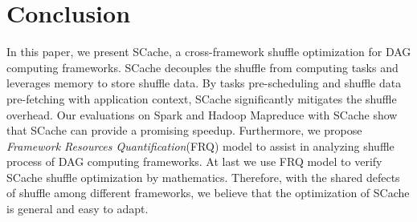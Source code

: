 \section{Conclusion}
In this paper, we present SCache, a cross-framework shuffle optimization for DAG computing frameworks. 
SCache decouples the shuffle from computing tasks and leverages memory to store shuffle data. 
By tasks pre-scheduling and shuffle data pre-fetching with application context, SCache significantly mitigates the shuffle overhead. 
{\color{blue}
Our evaluations on Spark and Hadoop Mapreduce with SCache show that SCache can provide a promising speedup. 
Furthermore, we propose \textit{Framework Resources Quantification}(FRQ) model to assist in analyzing shuffle process of DAG computing frameworks. At last we use FRQ model to verify SCache shuffle optimization by mathematics.
Therefore, with the shared defects of shuffle among different frameworks, we believe that the optimization of SCache is general and easy to adapt. 
}
